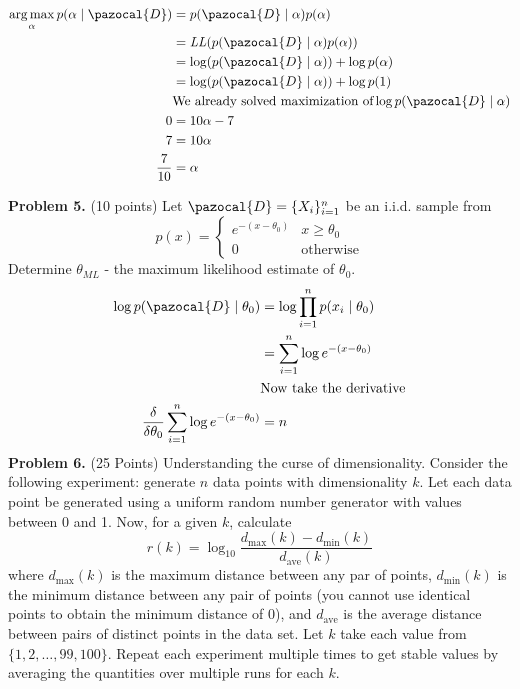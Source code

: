 \documentclass[a4 paper]{article}
\DeclareMathOperator*{\argmax}{arg\,max}
\begin{document}
\begin{enumerate}
	\begin{equation*}
	\begin{split}
	\argmax_{\alpha} p({\alpha \mid \pazocal{D}}) & = p(\pazocal{D} \mid \alpha)p(\alpha) \\
	& = \mathit{LL}(p(\pazocal{D} \mid \alpha)p(\alpha)) \\
	& = \log(p(\pazocal{D} \mid \alpha)) + \log p(\alpha) \\
	& = \log(p(\pazocal{D} \mid \alpha)) + \log p(1) \\
	& \text{We already solved maximization of} \log{p(\pazocal{D} \mid \alpha)} \\
	0 & = 10\alpha - 7 \\
	7 & = 10\alpha  \\
	\frac{7}{10} & = \alpha 
	\end{split}
	\end{equation*}
	\end{enumerate}
	\textbf{Problem 5.} (10 points) Let $\pazocal{D} = \{X_i\}^n_{i=1} $ be an i.i.d. sample from 
	\begin{equation*}
	p(x) = \begin{cases}
	e^{-(x-\theta_0)} & x \geq \theta_0 \\
	0 & \text{otherwise}
	\end{cases}
	\end{equation*}
	Determine $\theta_{ML}$ - the maximum likelihood estimate of $\theta_0$. 
	\begin{equation*}
	\begin{split}
	\log{p(\pazocal{D} \mid \theta_0)} & = \log{\prod_{i=1}^n p(x_i \mid \theta_0)} \\
	& = \sum_{i=1}^n \log{e^{-(x-\theta_0)}} \\
	& \text{Now take the derivative} \\
	\frac{\delta}{\delta\theta_0} \sum_{i=1}^n \log{e^{-(x-\theta_0)}} & = n
	\end{split}
	\end{equation*}
	\textbf{Problem 6.} (25 Points) Understanding the curse of dimensionality. Consider the following experiment: generate $n$ data points with dimensionality $k$. Let each data point be generated using a uniform random number generator with values between 0 and 1. Now, for a given $k$, calculate
	\begin{equation*}
	r(k) = \log_{10}{\frac{d_{\text{max}}(k) - d_{\text{min}}(k)}{d_{\text{ave}}(k)}}
	\end{equation*}
	where $d_{\text{max}}(k)$ is the maximum distance between any par of points, $d_{\text{min}}(k)$ is the minimum distance between any pair of points (you cannot use identical points to obtain the minimum distance of 0), and $d_{\text{ave}}$ is the average distance between pairs of distinct points in the data set. Let $k$ take each value from $\{1,2,\ldots, 99, 100\}$. Repeat each experiment multiple times to get stable values by averaging the quantities over multiple runs for each $k$.
\end{document}
